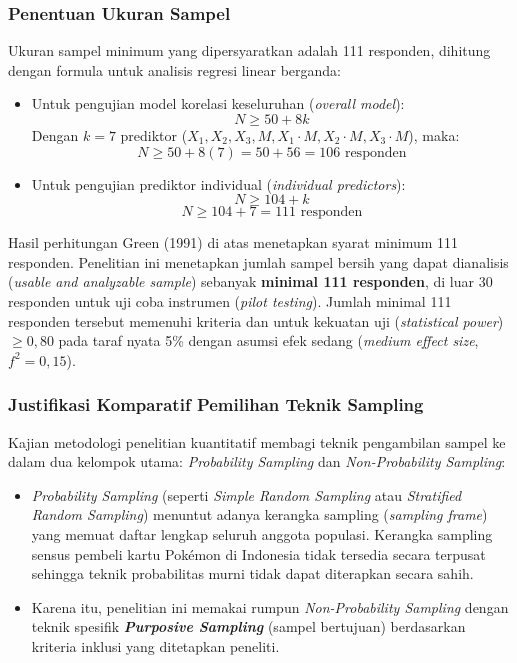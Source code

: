 \documentclass[12pt,a4paper]{article}
\numberwithin{equation}{section}
\numberwithin{table}{section}
\numberwithin{figure}{section}
\begin{document}
\subsubsection{Penentuan Ukuran Sampel}

Ukuran sampel minimum yang dipersyaratkan adalah 111 responden, dihitung dengan formula \citet{green1991subjects} untuk analisis regresi linear berganda:
\begin{itemize}
  \item Untuk pengujian model korelasi keseluruhan (\emph{overall model}):
  \begin{equation}
    N \ge 50 + 8k
    \label{eq:sampel_overall}
  \end{equation}
  Dengan $k = 7$ prediktor ($X_1, X_2, X_3, M, X_1 \cdot M, X_2 \cdot M, X_3 \cdot M$), maka:
  \[ N \ge 50 + 8(7) = 50 + 56 = 106\text{ responden} \]
  \item Untuk pengujian prediktor individual (\emph{individual predictors}):
  \begin{equation}
    N \ge 104 + k
    \label{eq:sampel_individual}
  \end{equation}
  \[ N \ge 104 + 7 = 111\text{ responden} \]
\end{itemize}

Hasil perhitungan Green (1991) di atas menetapkan syarat minimum 111 responden. Penelitian ini menetapkan jumlah sampel bersih yang dapat dianalisis (\emph{usable and analyzable sample}) sebanyak \textbf{minimal 111 responden}, di luar 30 responden untuk uji coba instrumen (\emph{pilot testing}). Jumlah minimal 111 responden tersebut memenuhi kriteria \citet{green1991subjects} dan \citet{cohen1988statistical} untuk kekuatan uji (\emph{statistical power}) $\ge 0,80$ pada taraf nyata 5\% dengan asumsi efek sedang (\emph{medium effect size}, $f^2 = 0,15$).

\subsubsection{Justifikasi Komparatif Pemilihan Teknik Sampling}

Kajian metodologi penelitian kuantitatif \citep{sekaran2016research, sugiyono2019metode} membagi teknik pengambilan sampel ke dalam dua kelompok utama: \emph{Probability Sampling} dan \emph{Non-Probability Sampling}:
\begin{itemize}
  \item \emph{Probability Sampling} (seperti \emph{Simple Random Sampling} atau \emph{Stratified Random Sampling}) menuntut adanya kerangka sampling (\emph{sampling frame}) yang memuat daftar lengkap seluruh anggota populasi. Kerangka sampling sensus pembeli kartu Pok\'emon di Indonesia tidak tersedia secara terpusat sehingga teknik probabilitas murni tidak dapat diterapkan secara sahih.
  \item Karena itu, penelitian ini memakai rumpun \emph{Non-Probability Sampling} dengan teknik spesifik \textbf{\emph{Purposive Sampling}} (sampel bertujuan) berdasarkan kriteria inklusi yang ditetapkan peneliti.
\end{itemize}
\end{document}
